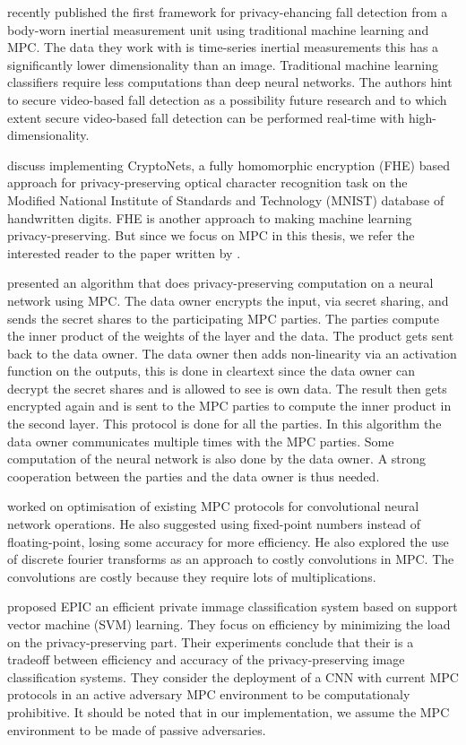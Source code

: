 \cite{mainali2019privacy} recently published the first framework for privacy-ehancing fall detection from a body-worn inertial measurement unit using traditional machine learning and MPC. The data they work with is time-series inertial measurements this has a significantly lower dimensionality than an image. Traditional machine learning classifiers require less computations than deep neural networks. The authors hint to secure video-based fall detection as a possibility future research and to which extent secure video-based fall detection can be performed real-time with high-dimensionality.

\cite{gilad2016cryptonets} discuss implementing CryptoNets, a fully homomorphic encryption (FHE) based approach for privacy-preserving optical character recognition task on the Modified National Institute of Standards and Technology (MNIST) database of handwritten digits. FHE is another approach to making machine learning privacy-preserving. But since we focus on MPC in this thesis, we refer the interested reader to the paper written by \cite{gentry2009fully}.

\cite{barni2006privacy} presented an algorithm that does privacy-preserving computation on a neural network using MPC. The data owner encrypts the input, via secret sharing, and sends the secret shares to the participating MPC parties. The parties compute the inner product of the weights of the layer and the data. The product gets sent back to the data owner. The data owner then adds non-linearity via an activation function on the outputs, this is done in cleartext since the data owner can decrypt the secret shares and is allowed to see is own data. The result then gets encrypted again and is sent to the MPC parties to compute the inner product in the second layer. This protocol is done for all the parties. In this algorithm the data owner communicates multiple times with the MPC parties. Some computation of the neural network is also done by the data owner. A strong cooperation between the parties and the data owner is thus needed.

\cite{campmans2018optimizing} worked on optimisation of existing MPC protocols for convolutional neural network operations. He also suggested using fixed-point numbers instead of floating-point, losing some accuracy for more efficiency. He also explored the use of discrete fourier transforms as an approach to costly convolutions in MPC. The convolutions are costly because they require lots of multiplications.

\cite{makri2019epic} proposed EPIC an efficient private immage classification system based on support vector machine (SVM) learning. They focus on efficiency by minimizing the load on the privacy-preserving part. Their experiments conclude that their is a tradeoff between efficiency and accuracy of the privacy-preserving image classification systems. They consider the deployment of a CNN with current MPC protocols in an active adversary MPC environment to be computationaly prohibitive. It should be noted that in our implementation, we assume the MPC environment to be made of passive adversaries.

